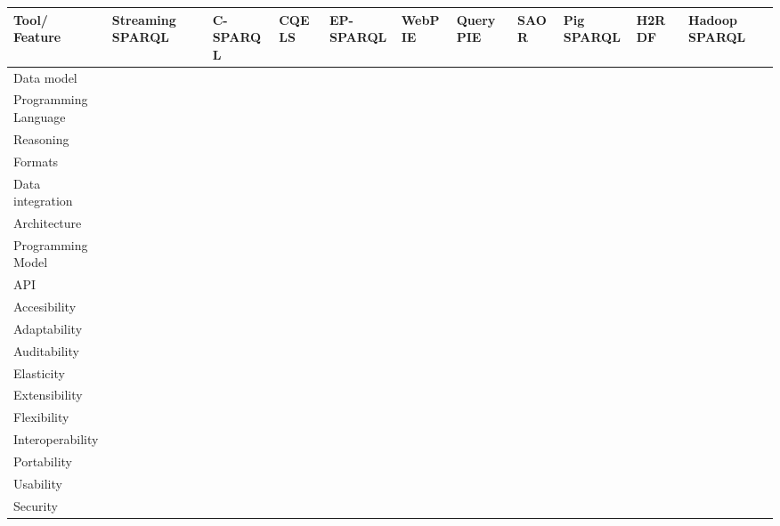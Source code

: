\begin{sidewaystable}[!ht]
\renewcommand{\arraystretch}{1.3}
\tiny
\begin{center}
\begin{tabular}[c]{|p{1.7cm}|p{1.5cm}|p{1.5cm}|p{1.5cm}|p{1.5cm}|p{1.5cm}|p{1.5cm}|p{1.5cm}|p{1.5cm}|p{1.5cm}|p{1.5cm}|} 
\hline
 \textbf{Tool/ Feature}  &  Streaming SPARQL~\cite{Bolles:2008:SSE:1789394.1789438} & C-SPARQL~\cite{Barbieri:2010:EEC:1739041.1739095} & CQELS~\cite{deri2010} & EP-SPARQL~\cite{Anicic:2011:EUL:1963405.1963495} & WebPIE~\cite{DBLP:journals/ws/UrbaniKMHB12} & QueryPIE~\cite{Urbani:2011:QBR:2063016.2063063} & SAOR~\cite{DBLP:journals/ijswis/HoganHP09} & Pig SPARQL~\cite{Schatzle:2011:PMS:1999299.1999303} & H2RDF~\cite{Papailiou:2012:HAQ:2187980.2188058} & Hadoop SPARQL~\cite{liuhadoopsparql}  \\ \hline
  Data model &  &   &  &  &  &  &  &  &  & \\ \hline  
  Programming Language &  &   &  &  &  &  &  &  &  & \\ \hline  
  Reasoning &  &   &  &  &  &  &  &  &  & \\ \hline  
  Formats &  &   &  &  &  &  &  &  &  & \\ \hline  
  Data integration &  &   &  &  &  &  &  &  &  & \\ \hline  
  Architecture &  &   &  &  &  &  &  &  &  & \\ \hline  
  Programming Model &  &   &  &  &  &  &  &  &  & \\ \hline  
  API &  &   &  &  &  &  &  &  &  & \\ \hline  
  Accesibility &  &   &  &  &  &  &  &  &  & \\ \hline  
  Adaptability &  &   &  &  &  &  &  &  &  & \\ \hline  
  Auditability &  &   &  &  &  &  &  &  &  & \\ \hline  
  Elasticity &  &   &  &  &  &  &  &  &  & \\ \hline  
  Extensibility &  &   &  &  &  &  &  &  &  & \\ \hline  
  Flexibility &  &   &  &  &  &  &  &  &  & \\ \hline  
  Interoperability &  &   &  &  &  &  &  &  &  & \\ \hline  
  Portability &  &   &  &  &  &  &  &  &  & \\ \hline  
  Usability &  &   &  &  &  &  &  &  &  & \\ \hline  
  Security &  &   &  &  &  &  &  &  &  & \\ \hline  

\end{tabular}
\end{center}
\end{sidewaystable}
